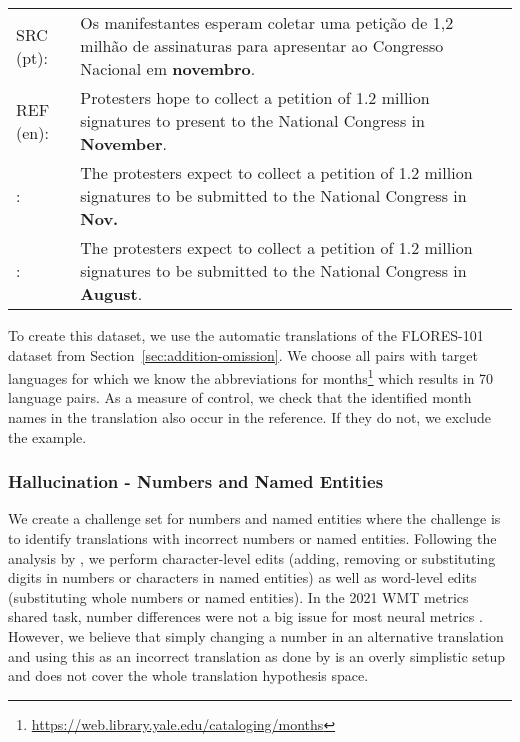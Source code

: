 \documentclass[11pt]{article}
\newcommand{\cmark}{\textcolor{darkpastelgreen}{\ding{51}}}\newcommand{\xmark}{\textcolor{darkpastelred}{\ding{55}}}
\begin{document}
\begin{small}
\vspace{0.5cm}
\setlength{\extrarowheight}{0.1cm}
\begin{tabularx}{0.95\columnwidth}{lX}
     SRC (pt): & Os manifestantes esperam coletar uma petição de 1,2 milhão de assinaturas para apresentar ao Congresso Nacional em \textbf{novembro}. \\
     REF (en): & Protesters hope to collect a petition of 1.2 million signatures to present to the National Congress in \textbf{November}. \\
     \cmark: & The protesters expect to collect a petition of 1.2 million signatures to be submitted to the National Congress in \textbf{Nov.} \\
     \xmark: & The protesters expect to collect a petition of 1.2 million signatures to be submitted to the National Congress in \textbf{August}. \vspace{0.35cm}
\end{tabularx}
\end{small}

To create this dataset, we use the automatic translations of the FLORES-101 dataset from Section~\ref{sec:addition-omission}. We choose all pairs with target languages for which we know the abbreviations for months\footnote{\url{https://web.library.yale.edu/cataloging/months}} which results in 70 language pairs. As a measure of control, we check that the identified month names in the translation also occur in the reference. If they do not, we exclude the example.

\subsubsection{Hallucination - Numbers and Named Entities}
\label{subsec:levels}
We create a challenge set for numbers and named entities where the challenge is to identify translations with incorrect numbers or named entities. Following the analysis by \citet{amrhein2022identifying}, we perform character-level edits (adding, removing or substituting digits in numbers or characters in named entities) as well as word-level edits (substituting whole numbers or named entities). In the 2021 WMT metrics shared task, number differences were not a big issue for most neural metrics \citep{freitag-etal-2021-results}. However, we believe that simply changing a number in an alternative translation and using this as an incorrect translation as done by \citet{freitag-etal-2021-results} is an overly simplistic setup and does not cover the whole translation hypothesis space. 
\end{document}
